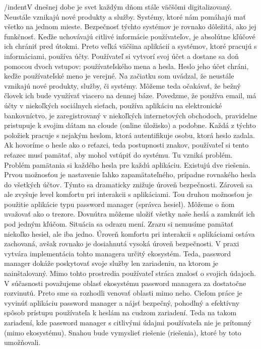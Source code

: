 /indent\indent	V dnešnej dobe je svet každým dňom stále väčšômi digitalizovaný. Neustále vznikajú nové produkty a služby. Systémy, ktoré nám pomáhajú mať všetko na jednom mieste. Bezpečnosť týchto systémov je rovnako dôležitá, ako jej funkčnosť. Keďže uchovávajú citlivé informácie používateľov, je absolútne kľúčové ich chrániť pred útokmi. Preto veľká väčšina aplikácií a systémov, ktoré pracujú s informáciami, používa účty. Používateľ si vytvorí svoj účet a dostane sa doň pomocou dvoch vstupov: používateľského mena a hesla. Heslo jeho účet chráni, keďže používateľské meno je verejné.
	Na začiatku som uvádzal, že neustále vznikajú nové produkty, služby, či systémy. Môžeme teda očakávať, že bežný človek ich bude využívať viacero na dennej báze. Povedzme, že používa email, má účty v niekoľkých sociálnych sieťach, používa aplikáciu na elektronické bankovníctvo, je zaregistrovaný v niekoľkých internetových obchodoch, pravidelne pristupuje k svojim dátam na cloude (online úložisko) a podobne. Každá z týchto položiek pracuje s nejakým heslom, ktorá autentifikuje osobu, ktorá heslo zadala.
	Ak hovoríme o hesle ako o reťazci, teda postupnosti znakov, používateľ si tento reťazec musí pamätať, aby mohol vstúpiť do systému. Tu vzniká problém. Problém pamätania si každého hesla pre každú aplikáciu. Existujú dve riešenia. Prvou možnosťou je nastavenie ľahko zapamätateľného, prípadne rovnakého hesla do všetkých účtov. Týmto sa dramaticky znižuje úroveň bezpečnosti. Zároveň sa ale zvyšuje level komfortu pri interakcii s aplikáciami.
	Tou druhou možnosťou je použitie aplikácie typu password manager (správca hesiel). Môžeme o ňom uvažovať ako o trezore. Dovnútra môžeme uložiť všetky naše heslá a zamknúť ich pod jedným kľúčom. Situácia sa odrazu mení. Zrazu si nemusíme pamätať niekoľko hesiel, ale iba jedno. Úroveň komfortu pri interakcii s aplikáciami ostáva zachovaná, avšak rovnako je dosiahnutá vysoká úroveň bezpečnosti.
	V praxi vytvára implementácia tohto managera určitý ekosystém. Teda, password manager dokáže poskytovať svoje služby len zariadeniu, na ktorom je nainštalovaný. Mimo tohto prostredia používateľ stráca znalosť o svojich údajoch. V súčasnosti považujeme oblasť ekosystému password managera za dostatočne rozvinutú. Preto sme sa rozhodli venovať oblasti mimo neho.
	Cieľom práce je vyvinúť aplikáciu password manager a nájsť bezpečný, pohodlný a efektívny spôsob prístupu používateľa k heslám na cudzom zariadení. Teda na takom zariadení, kde password manager s citlivými údajmi používateľa nie je prítomný (mimo ekosystému). Snahou bude vymyslieť riešenie (riešenia), ktoré by toto umožňovali.